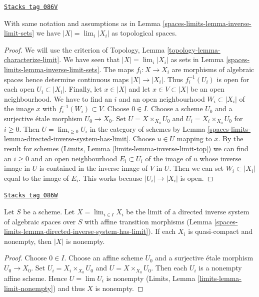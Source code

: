 \begin{lemma}
\label{spaces-limits-lemma-topology-limit}
\href{https://stacks.math.columbia.edu/tag/086V}{\texttt{Stacks tag 086V}}

With same notation and assumptions as in Lemma \ref{spaces-limits-lemma-inverse-limit-sets}
we have $|X| = \lim_i |X_i|$ as topological spaces.
\end{lemma}

\begin{proof}
We will use the criterion of
Topology, Lemma \ref{topology-lemma-characterize-limit}.
We have seen that $|X| = \lim_i |X_i|$ as sets in
Lemma \ref{spaces-limits-lemma-inverse-limit-sets}.
The maps $f_i : X \to X_i$ are morphisms of algebraic spaces
hence determine continuous maps $|X| \to |X_i|$.
Thus $f_i^{-1}(U_i)$ is open for each
open $U_i \subset |X_i|$. Finally,
let $x \in |X|$ and let $x \in V \subset |X|$ be an open
neighbourhood. We have to find an $i$ and an open neighbourhood
$W_i \subset |X_i|$ of the image $x$
with $f_i^{-1}(W_i) \subset V$.
Choose $0 \in I$. Choose a scheme $U_0$ and a surjective
\'etale morphism $U_0 \to X_0$. Set $U = X \times_{X_0} U_0$
and $U_i = X_i \times_{X_0} U_0$ for $i \geq 0$.
Then $U = \lim_{i \geq 0} U_i$ in the category of schemes by
Lemma \ref{spaces-limits-lemma-directed-inverse-system-has-limit}.
Choose $u \in U$ mapping to $x$. By the result for schemes
(Limits, Lemma \ref{limits-lemma-inverse-limit-top})
we can find an $i \geq 0$ and an open neighbourhood
$E_i \subset U_i$ of the image of $u$
whose inverse image in $U$ is contained in the
inverse image of $V$ in $U$. Then we can set $W_i \subset |X_i|$
equal to the image of $E_i$. This works because $|U_i| \to |X_i|$ is open.
\end{proof}

\begin{lemma}
\label{spaces-limits-lemma-limit-nonempty}
\href{https://stacks.math.columbia.edu/tag/086W}{\texttt{Stacks tag 086W}}

Let $S$ be a scheme. Let $X = \lim_{i \in I} X_i$ be the limit of a directed
inverse system of algebraic spaces over $S$ with affine transition morphisms
(Lemma \ref{spaces-limits-lemma-directed-inverse-system-has-limit}). If each $X_i$
is quasi-compact and nonempty, then $|X|$ is nonempty.
\end{lemma}

\begin{proof}
Choose $0 \in I$.
Choose an affine scheme $U_0$ and a surjective \'etale morphism $U_0 \to X_0$.
Set $U_i = X_i \times_{X_0} U_0$ and $U = X \times_{X_0} U_0$.
Then each $U_i$ is a nonempty affine scheme. Hence $U = \lim U_i$
is nonempty (Limits, Lemma \ref{limits-lemma-limit-nonempty}) and thus
$X$ is nonempty.
\end{proof}

